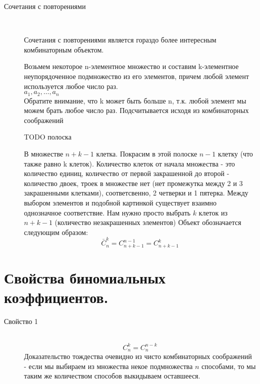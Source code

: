 \begin{description}
\item[Сочетания с повторениями]~	

Сочетания с повторениями является гораздо более интересным комбинаторным объектом.

Возьмем некоторое n-элементное множество и составим k-элементное неупорядоченное подмножество из его элементов, причем любой элемент используется любое число раз.\\
${a_1, a_2, \ldots ,a_n}$\\

Обратите внимание, что k может быть больше n, т.к. любой элемент мы можем брать любое число раз.
Подсчитывается исходя из комбинаторных соображений

TODO полоска

В множестве $n+k-1$ клетка. Покрасим в этой полоске $n-1$ клетку (что также равно k клеток).
Количество клеток от начала множества - это количество единиц, количество от первой закрашенной до второй - количество двоек, троек в множестве нет (нет промежутка между 2 и 3 закрашенными клетками), соответсвенно, 2 четверки и 1 пятерка.
Между выбором элементов и подобной картинкой существует взаимно однозначное соответствие.
Нам нужно просто выбрать $k$ клеток из $n+k-1$ (количество незакрашенных элементов)
Объект обозначается следующим образом:
$$
\bar{C}_n^k = C_{n+k-1}^{n-1} = C_{n+k-1}^k
$$
\end{description}

\section{Свойства биномиальных коэффициентов.}

\begin{description}
\item[Свойство 1]~	
$$
C_n^k = C_n^{n-k}
$$
Доказательство тождества очевидно из чисто комбинаторных соображений - если мы выбираем из множества некое подмножества $ n $ способами, то мы таким же количеством способов выкидываем оставшееся.
\end{description}


